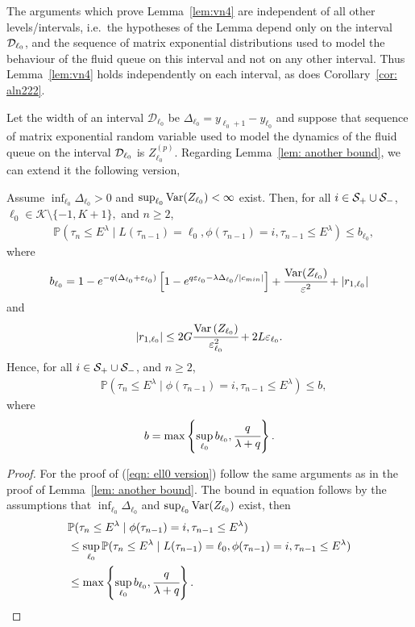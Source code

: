 The arguments which prove Lemma~\ref{lem:vn4} are independent of all other levels/intervals, i.e.~the hypotheses of the Lemma depend only on the interval \(\mathcal{D}_{\ell_0}\), and the sequence of matrix exponential distributions used to model the behaviour of the fluid queue on this interval and not on any other interval. Thus Lemma~\ref{lem:vn4} holds independently on each interval, as does Corollary~\ref{cor: aln222}.

Let the width of an interval \(\mathcal D_{\ell_0}\) be \(\Delta_{\ell_0}=y_{\ell_0+1}-y_{\ell_0}\) and suppose that sequence of matrix exponential random variable used to model the dynamics of the fluid queue on the interval \(\mathcal{D}_{\ell_0}\) is \(Z_{\ell_0}^{(p)}\). Regarding Lemma~\ref{lem: another bound}, we can extend it the following version, 
\begin{lem}\label{lem: another bound sdfg}
	Assume \(\inf_{\ell_0}\Delta_{\ell_0}>0\) and \(\sup_{\ell_0}\mathrm{Var}(Z_{\ell_0})<\infty\) exist. Then, for all \(i\in\mathcal S_+\cup \mathcal{S}_-\), \(\ell_0\in\mathcal K\setminus\{-1,K+1\},\) and \(n\geq 2\), 
	\begin{align}
		&\mathbb P(\tau_n\leq E^\lambda \mid L(\tau_{n-1}) = \ell_0, \phi(\tau_{n-1})=i, \tau_{n-1}\leq  E^\lambda ) \leq b_{\ell_0},\label{eqn: ell0 version}
	\end{align}
	where 
	\[b_{\ell_0} = 1-e^{-q(\Delta_{\ell_0}+\varepsilon_{\ell_0})}\left[1-e^{q\varepsilon_{\ell_0}-\lambda \Delta_{\ell_0}/|c_{min}|}\right] + \cfrac{\mathrm{Var}(Z_{\ell_0})}{\varepsilon^2} + |r_{1,\ell_0}| \]
	and  
	\[|r_{1,\ell_0}|\leq 2G\cfrac{\mathrm{Var} \left(Z_{\ell_0}\right)}{\varepsilon_{\ell_0}^2} + 2L\varepsilon_{\ell_0}.\]
	Hence, for all \(i\in\mathcal S_+\cup \mathcal{S}_-\), and \(n\geq 2\), 
	\begin{align}
		&\mathbb P(\tau_n\leq E^\lambda \mid \phi(\tau_{n-1})=i, \tau_{n-1}\leq  E^\lambda ) \leq b, \label{eqn: skjhg}
	\end{align}
	where 
	\[b = \max\left\{\sup_{\ell_0}b_{\ell_0}, \cfrac{q}{\lambda + q}\right\}.\]
\end{lem}
\begin{proof}
	For the proof of (\ref{eqn: ell0 version}) follow the same arguments as in the proof of Lemma~\ref{lem: another bound}. The bound in equation follows by the assumptions that \(\inf_{\ell_0}\Delta_{\ell_0}\) and \(\sup_{\ell_0}\mathrm{Var}(Z_{\ell_0})\) exist, then 
	\begin{align*}
		&\mathbb P(\tau_n\leq E^\lambda \mid \phi(\tau_{n-1})=i, \tau_{n-1}\leq  E^\lambda ) 
		\\&\leq \sup_{\ell_0} \mathbb P(\tau_n\leq E^\lambda \mid L(\tau_{n-1}) = \ell_0, \phi(\tau_{n-1})=i, \tau_{n-1}\leq  E^\lambda ) 
		\\&\leq \max\left\{\sup_{\ell_0}b_{\ell_0}, \cfrac{q}{\lambda + q}\right\}.\label{eqn: ell0 versionlskhg}
	\end{align*}
\end{proof}
